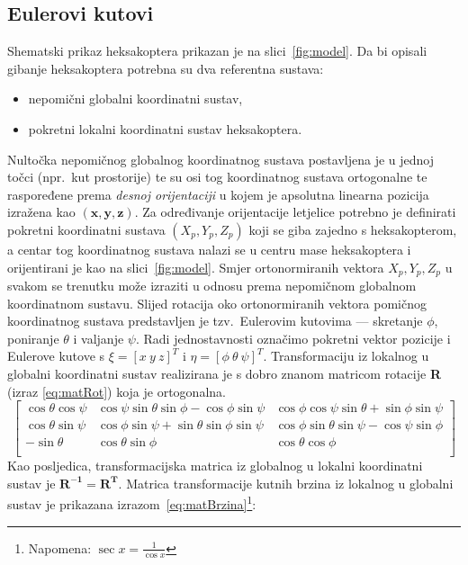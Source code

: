\documentclass[times, utf8, diplomski]{fer}
\begin{document}
\subsection{Eulerovi kutovi}\label{sec:Euler}
Shematski prikaz heksakoptera prikazan je na slici~\ref{fig:model}. Da bi opisali gibanje heksakoptera potrebna su dva referentna sustava:\begin{itemize}
\item nepomični globalni koordinatni sustav,
\item pokretni lokalni koordinatni sustav heksakoptera.
\end{itemize}
Nultočka nepomičnog globalnog koordinatnog sustava postavljena je u jednoj točci (npr.~kut prostorije) te su osi tog koordinatnog sustava ortogonalne te raspoređene prema \emph{desnoj orijentaciji} u kojem je apsolutna linearna pozicija izražena kao $(\mathbf{x,y,z})$. Za određivanje orijentacije letjelice potrebno je definirati pokretni koordinatni sustava $(X_p,Y_p,Z_p)$ koji se giba zajedno s heksakopterom, a centar tog koordinatnog sustava nalazi se u centru mase heksakoptera i orijentirani je kao na slici~\ref{fig:model}. Smjer ortonormiranih vektora $X_p,Y_p,Z_p$ u svakom se trenutku može izraziti u odnosu prema nepomičnom globalnom koordinatnom sustavu. Slijed rotacija oko ortonormiranih vektora pomičnog koordinatnog sustava predstavljen je tzv.~Eulerovim kutovima --- skretanje  $\phi$, poniranje  $\theta$ i valjanje  $\psi$. Radi jednostavnosti označimo pokretni vektor pozicije i Eulerove kutove s $\xi = [x ~y ~z]^T$ i $\eta = [\phi ~\theta ~\psi]^T$. Transformaciju iz  lokalnog u globalni koordinatni sustav realizirana je s dobro znanom matricom rotacije \textbf{R} (izraz \ref{eq:matRot}) koja je ortogonalna.
\begin{equation}
	\begin{bmatrix}
	\cos\theta\cos\psi & \cos\psi\sin\theta\sin\phi-\cos\phi\sin\psi & \cos\phi\cos\psi\sin\theta+\sin\phi\sin\psi \\
	\cos\theta\sin\psi & \cos\phi\sin\psi+\sin\theta\sin\phi\sin\psi & \cos\phi\sin\theta\sin\psi-\cos\psi\sin\phi \\
	-\sin\theta & \cos\theta\sin\phi & \cos\theta\cos\phi \\
	\end{bmatrix}
	\label{eq:matRot}
\end{equation}
Kao posljedica, transformacijska matrica iz globalnog u lokalni koordinatni sustav je $\mathbf{R^{-1} = R^{T}}$. Matrica transformacije kutnih brzina iz lokalnog u globalni sustav je prikazana izrazom~\ref{eq:matBrzina}\footnote{Napomena: $\sec x = \frac{1}{\cos x}$}:
\end{document}
